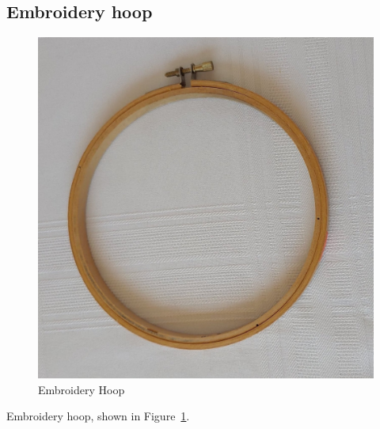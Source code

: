 \documentclass[letterpaper,twoside,12pt]{article}
\begin{document}
\subsection{Embroidery hoop}
\begin{figure}[hbpt]\begin{centering}%
\includegraphics[width=5in]{Embroideryhoop.jpg}
\caption{Embroidery Hoop}
\label{fig:embroideryhoop}
\end{centering}\end{figure}
Embroidery hoop, shown in Figure~\ref{fig:embroideryhoop}.
\clearpage
\end{document}
